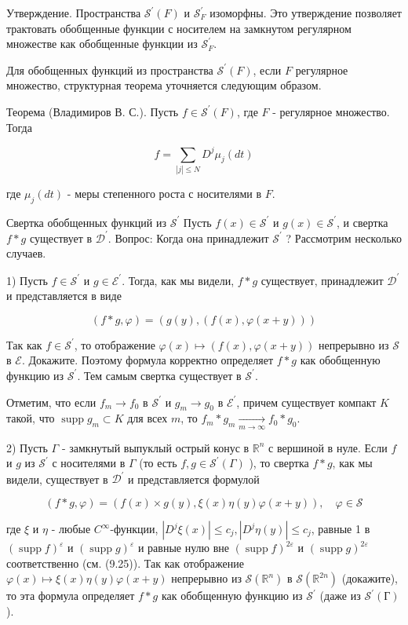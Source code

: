 Утверждение. Пространства $\mathcal{S}^{\prime}(F)$ и $\mathcal{S}_F^{\prime}$ изоморфны. Это утверждение позволяет трактовать обобщенные функции с носителем на замкнутом регулярном множестве как обобщенные функции из $\mathcal{S}_F^{\prime}$.

Для обобщенных функций из пространства $\mathcal{S}^{\prime}(F)$, если $F$ регулярное множество, структурная теорема уточняется следующим образом.

Теорема (Владимиров В. С.). Пусть $f \in \mathcal{S}^{\prime}(F)$, где $F$ - регулярное множество. Тогда

$$
f=\sum_{|j| \leqslant N} D^j \mu_j(d t)
$$


где $\mu_j(d t)$ - меры степенного роста с носителями в $F$.

Свертка обобщенных функций из $\mathcal{S}^{\prime}$ Пусть $f(x) \in \mathcal{S}^{\prime}$ и $g(x) \in \mathcal{S}^{\prime}$, и свертка $f * g$ существует в $\mathcal{D}^{\prime}$. Вопрос: Когда она принадлежит $\mathcal{S}^{\prime}$ ? Рассмотрим несколько случаев.

1) Пусть $f \in \mathcal{S}^{\prime}$ и $g \in \mathcal{E}^{\prime}$. Тогда, как мы видели, $f * g$ существует, принадлежит $\mathcal{D}^{\prime}$ и представляется в виде

$$
(f * g, \varphi)=(g(y),(f(x), \varphi(x+y)))
$$


Так как $f \in \mathcal{S}^{\prime}$, то отображение $\varphi(x) \mapsto(f(x), \varphi(x+y))$ непрерывно из $\mathcal{S}$ в $\mathcal{E}$. Докажите. Поэтому формула корректно определяет $f * g$ как обобщенную функцию из $\mathcal{S}^{\prime}$. Тем самым свертка существует в $\mathcal{S}^{\prime}$.

Отметим, что если $f_m \rightarrow f_0$ в $\mathcal{S}^{\prime}$ и $g_m \rightarrow g_0$ в $\mathcal{E}^{\prime}$, причем существует компакт $K$ такой, что $\operatorname{supp} g_m \subset K$ для всех $m$, то $f_m * g_m \xrightarrow[m \rightarrow \infty]{ } f_0 * g_0$.

2) Пусть $\Gamma$ - замкнутый выпуклый острый конус в $\mathbb{R}^n$ с вершиной в нуле. Если $f$ и $g$ из $\mathcal{S}^{\prime}$ с носителями в $\Gamma$ (то есть $f, g \in \mathcal{S}^{\prime}(\Gamma)$ ), то свертка $f * g$, как мы видели, существует в $\mathcal{D}^{\prime}$ и представляется формулой

$$
(f * g, \varphi)=(f(x) \times g(y), \xi(x) \eta(y) \varphi(x+y)), \quad \varphi \in \mathcal{S}
$$

где $\xi$ и $\eta$ - любые $C^{\infty}$-функции, $\left|D^j \xi(x)\right| \leqslant c_j,\left|D^j \eta(y)\right| \leqslant c_j$, равные 1 в $(\operatorname{supp} f)^{\varepsilon}$ и $(\operatorname{supp} g)^{\varepsilon}$ и равные нулю вне $(\operatorname{supp} f)^{2 \varepsilon}$ и $(\operatorname{supp} g)^{2 \varepsilon}$ соответственно (см. (9.25)). Так как отображение $\varphi(x) \mapsto \xi(x) \eta(y) \varphi(x+y)$ непрерывно из $\mathcal{S}\left(\mathbb{R}^n\right)$ в $\mathcal{S}\left(\mathbb{R}^{2 n}\right)$ (докажите), то эта формула определяет $f * g$ как обобщенную функцию из $\mathcal{S}^{\prime}$ (даже из $\mathcal{S}^{\prime}(Г)$ ).


